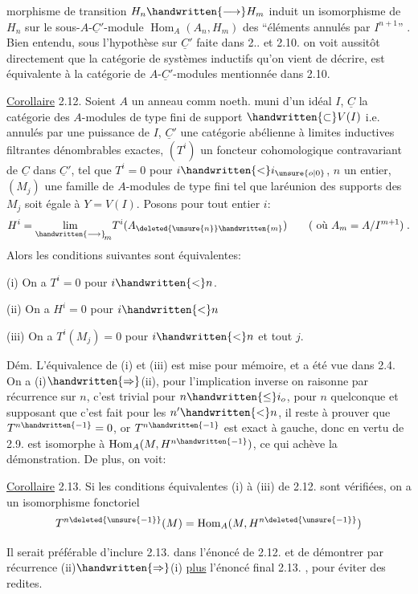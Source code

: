 %
morphisme de transition $H_n\handwritten{\longrightarrow}H_m$ induit un isomorphisme de $H_n$ sur le
sous-$A$-$\underline C'$-module $\operatorname{Hom}_A(A_n,H_m)$ des ``éléments annulés par $I^{n+1}$'' . Bien
entendu, sous l'hypothèse sur $\underline C'$ faite dans 2.. et 2.10. on voit aussitôt directement que la catégorie de systèmes inductifs qu'on vient de
décrire, est équivalente à  la catégorie de $A$-$\underline C'$-modules mentionnée dans 2.10.

\uline{Corollaire} 2.12. Soient $A$ un anneau comm noeth. muni d'un idéal $I$,
$\underline C$ la catégorie des $A$-modules de type fini de support $\handwritten{\subset}V(I)$ i.e. annulés
par une puissance de $I$, $\underline C'$ une catégorie abélienne à limites inductives
filtrantes dénombrables exactes, $(T^i)$ un foncteur cohomologique
contravariant de $\underline C$ dans $\underline C'$, tel que $T^i=0$ pour $i\handwritten{<}i_{\unsure{o|0}}$, $n$ un entier,
$(M_j)$ une famille de $A$-modules de type fini tel que laréunion des
supports des $M_j$ soit égale à $Y=V(I)$.  Posons pour tout entier $i$:
\[
H^i=\underset{\handwritten{\longrightarrow}}{\lim}_{\!m}T^i(A_{\deleted{\unsure{n}}\handwritten{m}})\qquad(\text{ où }A_m=A/I^{m+1})\;.
\]
Alors les conditions suivantes sont équivalentes:

(i) On a $T^i=0$ pour $i\handwritten{<}n$.

(ii) On a $H^i=0$ pour $i\handwritten{<}n$

(iii) On a $T^i(M_j)=0$ pour $i\handwritten{<}n$ et tout $j$.

Dém. L'équivalence de (i) et (iii) est mise pour mémoire, et a été
vue dans 2.4. On a (i)$\handwritten{\Rightarrow}$(ii), pour l'implication inverse on
raisonne par récurrence sur $n$, c'est trivial pour $n\handwritten{\leq}i_o$, pour $n$ quelconque
et supposant que c'est fait pour les $n'\handwritten{<}n$, il reste à prouver que $T^{n\handwritten{-1}}=0$,
or $T^{n\handwritten{-1}}$ est exact à gauche, donc en vertu de 2.9. est isomorphe à
$\operatorname{Hom}_A(M,H^{n\handwritten{-1}})$,  ce qui achève la démonstration. De plus, on voit:

\uline{Corollaire} 2.13. Si les conditions équivalentes (i) à (iii) de 2.12. sont
vérifiées, on a un isomorphisme fonctoriel
\[
T^{n\deleted{\unsure{-1}}}(M)=\operatorname{Hom}_A(M,H^{n\deleted{\unsure{-1}}})
\]

Il serait préférable d'inclure 2.13. dans l'énoncé de 2.12. et de
démontrer par récurrence (ii)$\handwritten{\Rightarrow}$(i) \uline{plus} l'énoncé final 2.13. , pour éviter des redites.

